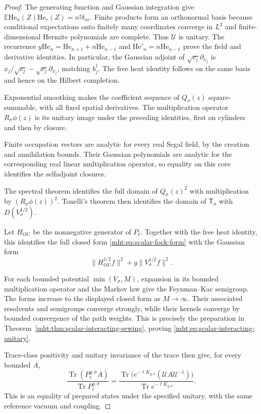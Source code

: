 \begin{proof}
The generating function and Gaussian integration give
$\mathbb E\mathrm{He}_n(Z)\mathrm{He}_r(Z)=n!\delta_{nr}$.
Finite products form an orthonormal basis because conditional
expectations onto finitely many coordinates converge in $L^2$ and
finite-dimensional Hermite polynomials are complete. Thus $\mathcal U$
is unitary. The recurrence
$y\mathrm{He}_n=\mathrm{He}_{n+1}+n\mathrm{He}_{n-1}$ and
$\mathrm{He}'_n=n\mathrm{He}_{n-1}$ prove the field and derivative
identities. In particular, the Gaussian adjoint of
$\sqrt{c_j}\partial_{x_j}$ is
$x_j/\sqrt{c_j}-\sqrt{c_j}\partial_{x_j}$, matching $b_j^\dagger$.
The free heat identity follows on the same basis and hence on the
Hilbert completion.

Exponential smoothing makes the coefficient sequence of
$Q_\sigma(z)$ square-summable, with all fixed spatial derivatives.
The multiplication operator $R_\sigma\phi(z)$ is its unitary image
under the preceding identities, first on cylinders and then by closure.

Finite occupation vectors are analytic for every real Segal field,
by the creation and annihilation bounds. Their Gaussian polynomials
are analytic for the corresponding real linear multiplication
operator, so equality on this core identifies the selfadjoint closures.

The spectral theorem identifies the full domain of $Q_\sigma(z)^2$
with multiplication by $(R_\sigma\phi(z))^2$. Tonelli's theorem then
identifies the domain of $\mathsf T_\sigma$ with $D(V_\sigma^{1/2})$.

Let $H_{\mathrm{OU}}$ be the nonnegative generator of $P_\ell$.
Together with the free heat identity, this identifies the full
closed form \eqref{mht:eq:scalar-fock-form} with the Gaussian form
\[
 \|H_{\mathrm{OU}}^{1/2}f\|^2
                       +g\|V_\sigma^{1/2}f\|^2.
\]

For each bounded potential $\min(V_\sigma,M)$, expansion in its
bounded multiplication operator and the Markov law give the
Feynman--Kac semigroup. The forms increase to the displayed closed
form as $M\to\infty$. Their associated resolvents and semigroups
converge strongly, while their kernels converge by bounded
convergence of the path weights. This is precisely the preparation
in Theorem~\ref{mht:thm:scalar-interacting-sewing}, proving
\eqref{mht:eq:scalar-interacting-unitary}.

Trace-class positivity and unitary
invariance of the trace then give, for every bounded $A$,
\[
 \frac{\operatorname{Tr}(P_\ell^{g,\sigma}A)}{\operatorname{Tr} P_\ell^{g,\sigma}}
 =\frac{\operatorname{Tr}\bigl(e^{-\ell K_{g,\sigma}}
                   (\mathcal UA\mathcal U^{-1})\bigr)}
        {\operatorname{Tr} e^{-\ell K_{g,\sigma}}}.
\]
This is an equality of prepared states under the specified unitary,
with the same reference vacuum and coupling.
\end{proof}

